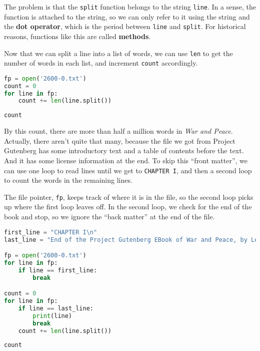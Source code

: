 The problem is that the \passthrough{\lstinline!split!} function belongs
to the string \passthrough{\lstinline!line!}. In a sense, the function
is attached to the string, so we can only refer to it using the string
and the \textbf{dot operator}, which is the period between
\passthrough{\lstinline!line!} and \passthrough{\lstinline!split!}. For
historical reasons, functions like this are called \textbf{methods}.

Now that we can split a line into a list of words, we can use
\passthrough{\lstinline!len!} to get the number of words in each list,
and increment \passthrough{\lstinline!count!} accordingly.

\begin{lstlisting}[language=Python,style=source]
fp = open('2600-0.txt')
count = 0
for line in fp:
    count += len(line.split())
\end{lstlisting}

\begin{lstlisting}[language=Python,style=source]
count
\end{lstlisting}

By this count, there are more than half a million words in \emph{War and
Peace}. Actually, there aren't quite that many, because the file we got
from Project Gutenberg has some introductory text and a table of
contents before the text. And it has some license information at the
end. To skip this ``front matter'', we can use one loop to read lines
until we get to \passthrough{\lstinline!CHAPTER I!}, and then a second
loop to count the words in the remaining lines.

The file pointer, \passthrough{\lstinline!fp!}, keeps track of where it
is in the file, so the second loop picks up where the first loop leaves
off. In the second loop, we check for the end of the book and stop, so
we ignore the ``back matter'' at the end of the file.

\begin{lstlisting}[language=Python,style=source]
first_line = "CHAPTER I\n"
last_line = "End of the Project Gutenberg EBook of War and Peace, by Leo Tolstoy\n"

fp = open('2600-0.txt')
for line in fp:
    if line == first_line:
        break

count = 0
for line in fp:
    if line == last_line:
        print(line)
        break
    count += len(line.split())
\end{lstlisting}

\begin{lstlisting}[language=Python,style=source]
count
\end{lstlisting}

